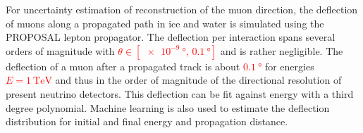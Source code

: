 For uncertainty estimation of reconstruction of the muon direction, the 
deflection of muons along a propagated path in ice and water is simulated using 
the PROPOSAL lepton propagator. The deflection per interaction spans several 
orders of magnitude with \textcolor{red}{$\theta \in [\SI[print-unity-mantissa = false]{e-9}{\degree},\, \SI{0.1}{\degree}]$} 
and is rather negligible. The 
deflection of a muon after a propagated track is about \textcolor{red}{$\SI{0.1}{\degree}$} for 
energies \textcolor{red}{$E = \SI{1}{\tera\electronvolt}$} and thus in the order of magnitude of 
the directional resolution of 
present neutrino detectors. This deflection can be fit against energy with a 
third degree polynomial. Machine learning is also used to estimate the 
deflection distribution for initial and final energy and propagation distance. 




